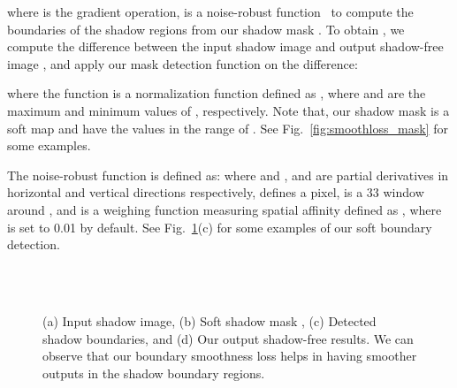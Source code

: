 \documentclass[10pt,twocolumn,letterpaper]{article}
\begin{document}
where  is the gradient operation,  is a noise-robust function~\cite{xu2012structure, sharma2018into, yan2020nighttime} to compute the boundaries of the shadow regions from our shadow mask . 
To obtain , we compute the difference between the input shadow image  and output shadow-free image , and apply our mask detection function  on the difference:

where the function  is a normalization function defined as , where  and  are the maximum and minimum values of , respectively. Note that, our shadow mask  is a soft map and have the values in the range of . See Fig.~\ref{fig:smoothloss_mask} for some examples. 

The noise-robust function  is defined as:   where  and 
,   and  are partial derivatives in horizontal and vertical directions respectively,  defines a pixel,  is a 33 window around , and  is a weighing function measuring spatial affinity defined as , where  is set to 0.01 by default. See Fig.~\ref{fig:smoothloss}(c) for some examples of our soft boundary detection. 

\begin{figure}[t]
	\centering
\captionsetup[subfloat]{farskip=2pt}
	\hfill
	\hfill
	\hfill
	\hfill\\
	\vspace{-0.01in}
	\setcounter{subfigure}{0}	
	\hfill
	\hfill
	\hfill
	\hfill\\
	\vspace{-0.01in}
	\caption{(a) Input shadow image, (b) Soft shadow mask , (c) Detected shadow boundaries, and (d) Our output shadow-free results. We can observe that our boundary smoothness loss helps in having smoother outputs in the shadow boundary regions.}
	\vspace{-0.1in}
	\label{fig:smoothloss}
\end{figure}
\end{document}
